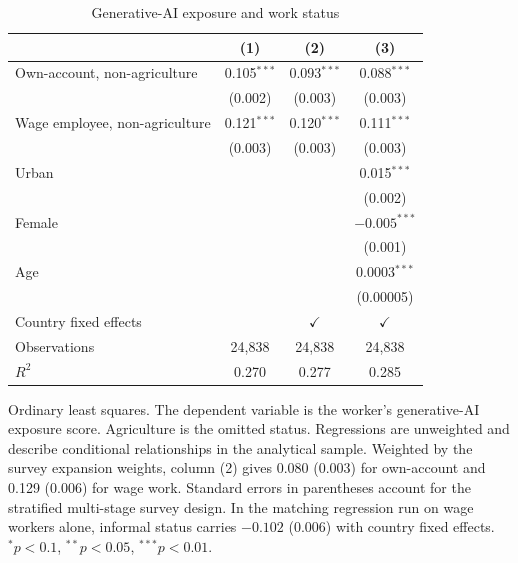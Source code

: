 \begin{table}[ht]
\centering
\caption{Generative-AI exposure and work status}
\label{tab:reg}
\small
\begin{tabular}{lccc}
\toprule
 & (1) & (2) & (3) \\
\midrule
Own-account, non-agriculture   & 0.105$^{***}$ & 0.093$^{***}$ & 0.088$^{***}$ \\
                               & (0.002) & (0.003) & (0.003) \\
Wage employee, non-agriculture & 0.121$^{***}$ & 0.120$^{***}$ & 0.111$^{***}$ \\
                               & (0.003) & (0.003) & (0.003) \\
Urban                          &         &         & 0.015$^{***}$ \\
                               &         &         & (0.002) \\
Female                         &         &         & $-0.005^{***}$ \\
                               &         &         & (0.001) \\
Age                            &         &         & 0.0003$^{***}$ \\
                               &         &         & (0.00005) \\
\midrule
Country fixed effects          &         & $\checkmark$ & $\checkmark$ \\
Observations                   & 24{,}838 & 24{,}838 & 24{,}838 \\
$R^2$                          & 0.270   & 0.277   & 0.285 \\
\bottomrule
\end{tabular}

\vspace{4pt}
\begin{minipage}{0.9\linewidth}
\footnotesize
Ordinary least squares. The dependent variable is the worker's generative-AI
exposure score. Agriculture is the omitted status. Regressions are unweighted
and describe conditional relationships in the analytical sample. Weighted by
the survey expansion weights, column (2) gives 0.080 (0.003) for own-account
and 0.129 (0.006) for wage work. Standard errors in
parentheses account for the stratified multi-stage survey design. In the
matching regression run on wage workers alone, informal status carries $-0.102$
(0.006) with country fixed effects. $^{*}p<0.1$, $^{**}p<0.05$, $^{***}p<0.01$.
\end{minipage}
\end{table}

